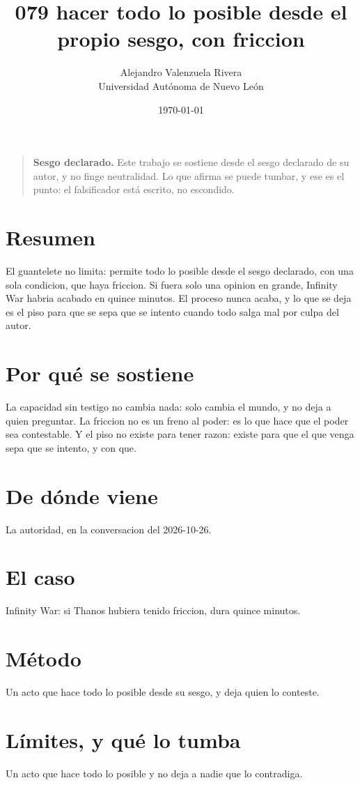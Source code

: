 \documentclass[11pt,a4paper]{article}
\title{079 hacer todo lo posible desde el propio sesgo, con friccion}
\author{Alejandro Valenzuela Rivera\\\small Universidad Autónoma de Nuevo León}
\date{\today}
\begin{document}
\maketitle

\begin{quote}
\textbf{Sesgo declarado.} Este trabajo se sostiene desde el sesgo declarado de su autor, y no finge neutralidad. Lo que afirma se puede tumbar, y ese es el punto: el falsificador está escrito, no escondido.
\end{quote}

\section*{Resumen}
El guantelete no limita: permite todo lo posible desde el sesgo declarado, con una sola condicion, que haya friccion. Si fuera solo una opinion en grande, Infinity War habria acabado en quince minutos. El proceso nunca acaba, y lo que se deja es el piso para que se sepa que se intento cuando todo salga mal por culpa del autor.

\section{Por qué se sostiene}
La capacidad sin testigo no cambia nada: solo cambia el mundo, y no deja a quien preguntar. La friccion no es un freno al poder: es lo que hace que el poder sea contestable. Y el piso no existe para tener razon: existe para que el que venga sepa que se intento, y con que.

\section{De dónde viene}
La autoridad, en la conversacion del 2026-10-26.

\section{El caso}
Infinity War: si Thanos hubiera tenido friccion, dura quince minutos.

\section{Método}
Un acto que hace todo lo posible desde su sesgo, y deja quien lo conteste.

\section{Límites, y qué lo tumba}
Un acto que hace todo lo posible y no deja a nadie que lo contradiga.
\end{document}
